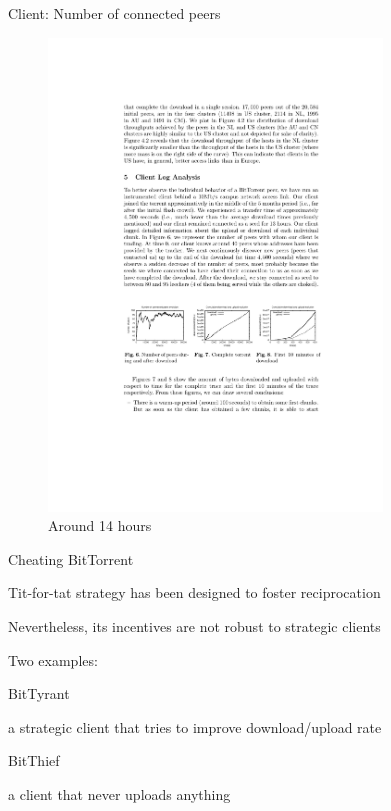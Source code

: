 \begin{frame}{Client: Number of connected peers}

\begin{figure}	
	\includegraphics[width=0.79\textwidth]{bt-fig5}
	\caption{Around 14 hours}
\end{figure}	
	
\end{frame}

\begin{frame}[shrink]{Cheating BitTorrent}

\BIL
\item Tit-for-tat strategy has been designed to foster reciprocation
\item Nevertheless, its incentives are not robust to strategic clients
\item Two examples:
	\BI
	\item \alert{BitTyrant}
		\BI
		\item a strategic client that tries to improve download/upload rate
		\EI
	\item \alert{BitThief}
		\BI
		\item a client that never uploads anything
		\EI
	\EI
\EIL

\begin{Bib}
{\scriptsize
\BI
\item	{}
\item 	{}
\EI
}
\end{Bib}

\end{frame}

